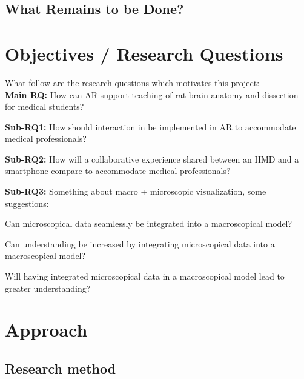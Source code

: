 



\subsection*{What Remains to be Done?}

\section{Objectives / Research Questions}
What follow are the research questions which motivates this project: \\
\noindent
\textbf{Main RQ:} How can AR support teaching of rat brain anatomy and dissection for medical students?
\begin{itemize}
    \item {
        \textbf{Sub-RQ1:} How should interaction in be implemented in AR to accommodate medical professionals?
    }
    \item {
        \textbf{Sub-RQ2:} How will a collaborative experience shared between an HMD and a smartphone compare to accommodate medical professionals?
    }
    {
        \newline
        \color{BrickRed}
        \textbf{Sub-RQ3: }
        Something about macro + microscopic visualization, some suggestions:
        \item Can microscopical data seamlessly be integrated into a macroscopical model? 

        \item Can understanding be increased by integrating microscopical data into a macroscopical model?

        \item Will having integrated microscopical data in a macroscopical model lead to greater understanding?
    }
\end{itemize}


\section{Approach}


\subsection*{Research method}

